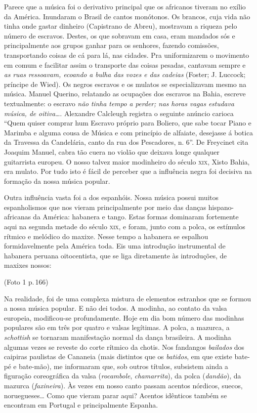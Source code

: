 Parece que a música foi o derivativo principal que os africanos tiveram
no exílio da América. Inundaram o Brasil de cantos monótonos. Os
brancos, cuja vida não tinha onde gastar dinheiro (Capistrano de Abreu),
mostravam a riqueza pelo número de escravos. Destes, os que sobravam em
casa, eram mandados sós e principalmente aos grupos ganhar para os
senhores, fazendo comissões, transportando coisas de cá para lá, nas
cidades. Pra uniformizarem o movimento em comum e facilitar assim o
transporte das coisas pesadas, cantavam sempre e \textit{as ruas ressoavam,
ecoando a bulha das vozes e das cadeias} (Foster; J. Luccock; príncipe
de Wied). Os negros escravos e os mulatos se especializavam mesmo na
música. Manuel Querino, relatando as ocupações dos escravos na Bahia,
escreve textualmente: o escravo \textit{não tinha tempo a perder; nas horas
vagas estudava música, de oitiva\ldots{}}. Alexandre Calcleugh registra o
seguinte anúncio carioca ``Quem quiser comprar hum Escravo próprio para
Boliero, que sabe tocar Piano e Marimba e alguma cousa de Música e com
princípio de alfaiate, desejasse á botica da Travessa da Candelária,
canto da rua dos Pescadores, n. 6''. De Freycinet cita Joaquim Manuel,
cabra tão cuera no violão que deixava longe qualquer guitarrista
europeu. O nosso talvez maior modinheiro do século \textsc{xix}, Xisto Bahia, era
mulato. Por tudo isto é fácil de perceber que a influência negra foi
decisiva na formação da nossa música popular.

Outra influência vasta foi a dos espanhóis. Nossa música possui muitos
espanholismos que nos vieram principalmente por meio das danças
hispano-africanas da América: habanera e tango. Estas formas dominaram
fortemente aqui na segunda metade do século \textsc{xix}, e foram, junto com a
polca, os estímulos rítmico e melódico do maxixe. Nesse tempo a habanera
se espalhou formidavelmente pela América toda. Eis uma introdução
instrumental de habanera peruana oitocentista, que se liga diretamente
às introduções, de maxixes nossos:

(Foto 1 p.\,166)

Na realidade, foi de uma complexa mistura de elementos estranhos que se
formou a nossa música popular. E não dei todos. A modinha, ao contato da
valsa europeia, modificou-se profundamente. Hoje em dia bom número das
modinhas populares são em três por quatro e valsas legítimas. A polca, a
mazurca, a \textit{schottish} se tornaram manifestação normal da dança
brasileira. A modinha algumas vezes se reveste do corte rítmico da
chotis. Nos fandangos \textit{bailados} dos caipiras paulistas de Cananeia
(mais distintos que os \textit{batidos}, em que existe bate-pé e bate-mão),
me informaram que, sob outros títulos, subsistem ainda a figuração
coreográfica da valsa (\textit{rocambole}, \textit{chamarrita}), da polca (\textit{dandão}), da
mazurca (\textit{faxineira}). Às vezes em nosso canto passam acentos nórdicos,
suecos, noruegueses\ldots{} Como que vieram parar aqui? Acentos idênticos
também se encontram em Portugal e principalmente Espanha.

